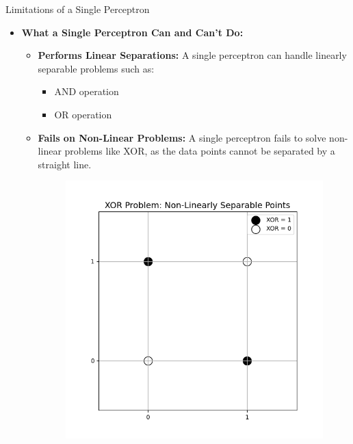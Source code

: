 \documentclass[serif, aspectratio=169]{beamer}
\begin{document}
\begin{frame}{Limitations of a Single Perceptron}
    \begin{itemize}
        \item \textbf{What a Single Perceptron Can and Can't Do:}
        \medskip
        \begin{itemize}\itemsep1em
            \item \justifying \textbf{Performs Linear Separations:}
            A single perceptron can handle linearly separable problems such as:
            \begin{itemize}
                \item AND operation
                \item OR operation
            \end{itemize}
            \item \justifying \textbf{Fails on Non-Linear Problems:}
            A single perceptron fails to solve non-linear problems like XOR, as the data points cannot be separated by a straight line.
            \endminipage
            \hfill
            \begin{figure}
                \centering
                \includegraphics[width=\linewidth]{pic/Figure_23.png}
            \end{figure}
            \endminipage
        \end{itemize}
    \end{itemize}
\end{frame}
\end{document}
